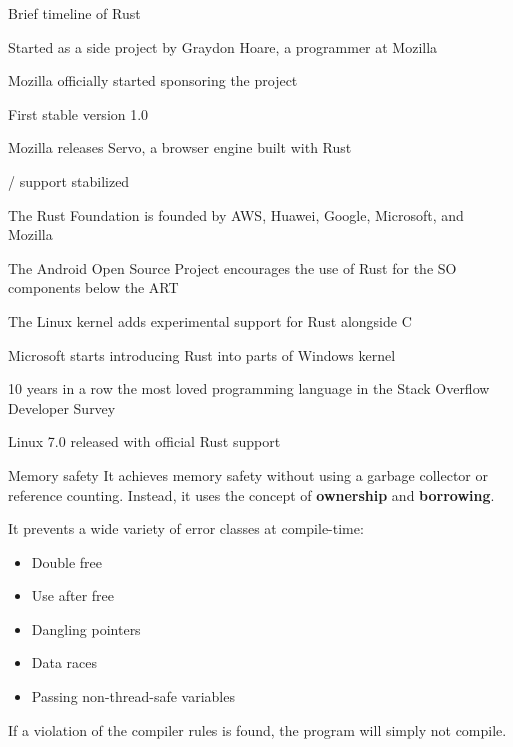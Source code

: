 \documentclass{beamer}
\begin{document}
\begin{frame}{Brief timeline of Rust}
  \footnotesize
  \setlength{}
  \begin{list}{}{%
      \setlength{}%
      \setlength\leftmargin{}%
      \setlength\itemsep{0.5ex}%
    }
    \item [2007] Started as a side project by Graydon Hoare, a programmer at Mozilla
    \item [2009] Mozilla officially started sponsoring the project
    \item [2015] First stable version 1.0
    \item [2016] Mozilla releases Servo, a browser engine built with Rust
    \item [2019] / support stabilized
    \item [2021] The Rust Foundation is founded by AWS, Huawei, Google, Microsoft, and Mozilla
    \item [2021] The Android Open Source Project encourages the use of Rust for the SO components below the ART
    \item [2022] The Linux kernel adds experimental support for Rust alongside C
    \item [2023] Microsoft starts introducing Rust into parts of Windows kernel
    \item [2025] 10 years in a row the most loved programming language in the Stack Overflow Developer Survey
    \item [2026] Linux 7.0 released with official Rust support
  \end{list}
\end{frame}

\begin{frame}{Memory safety}
  It achieves memory safety without using a garbage collector or reference counting.
  Instead, it uses the concept of \textbf{ownership} and \textbf{borrowing}.

  \vfill

  It prevents a wide variety of error classes at compile-time:

  \begin{itemize}
    \item Double free
    \item Use after free
    \item Dangling pointers
    \item Data races
    \item Passing non-thread-safe variables
  \end{itemize}

  \vfill

  If a violation of the compiler rules is found, the program will simply not compile.
\end{frame}
\end{document}
